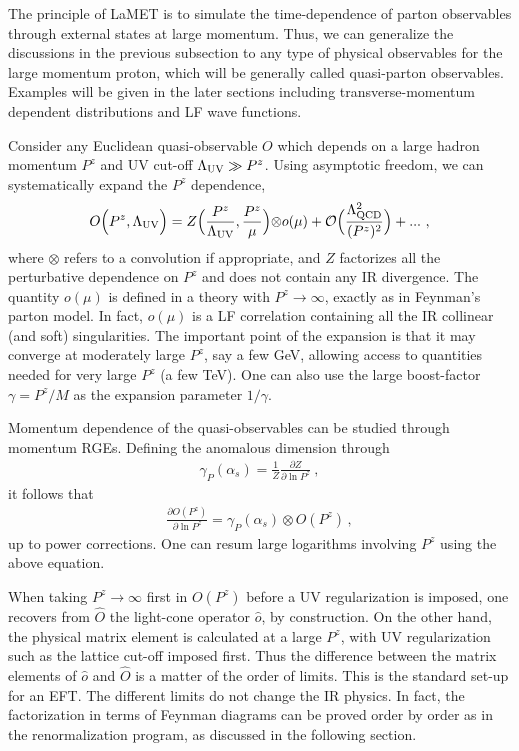 The principle of LaMET is to simulate the time-dependence of parton observables through external states at large momentum.
Thus, we can generalize the discussions in the previous subsection
to any type of physical observables for the large momentum
proton, which will be generally called quasi-parton observables.
Examples will be given in the later sections including
transverse-momentum dependent distributions and LF wave functions.

Consider any Euclidean quasi-observable $O$ which depends
on a large hadron momentum $P^z$
and UV cut-off $\Lambda_{\rm UV}\gg P^z$.
Using asymptotic freedom, we can systematically
expand the $P^z$ dependence,
\begin{align}
	O\Big(P^z,\Lambda_{\rm UV}\Big) = Z\Big({P^z\over\Lambda_{\rm UV}},
	{P^z\over \mu}\Big){\otimes}o(\mu) + {\cal O}\Big({\Lambda_{\rm QCD}^2\over (P^z)^2}\Big)+ ... \ ,
	\label{eq:Expansion}
\end{align}
where $\otimes$ refers to a convolution if appropriate, and $Z$ factorizes all the perturbative
dependence on $P^z$ and does not contain any IR divergence.
The quantity $o(\mu)$ is defined in a theory with $P^z\rightarrow \infty$, exactly
as in Feynman's parton model. In fact, $o(\mu)$ is a LF
correlation containing all the IR collinear (and soft)
singularities. The important point of the expansion is that it
may converge at moderately large $P^z$, say a few GeV, allowing
access to quantities needed for very large $P^z$ (a few TeV).
One can also use the large boost-factor $\gamma=P^z/M$ as the expansion
parameter $1/\gamma$.

Momentum dependence of the quasi-observables can be
studied through momentum RGEs. Defining the anomalous dimension through
\begin{align}
	\gamma_P(\alpha_s) = \frac{1}{Z}\frac{\partial Z}{\partial \ln P^z} \ ,
\end{align}
it follows{ that}
\begin{align}
	\frac{\partial O(P^z)}{\partial \ln P^z} = \gamma_P(\alpha_s) \otimes O(P^z) \,,
\end{align}
up to power corrections. One can resum large logarithms involving $P^z$ using the above equation.

When taking $P^z\rightarrow \infty$ first
in $O(P^z)$ before a UV regularization is imposed, one recovers from $\hat O$ the
light-cone operator $\hat o$, by construction. On the other hand, the physical matrix
element is calculated at a large $P^z$, with UV regularization such as the lattice cut-off
imposed first. Thus the difference between the matrix elements of $\hat o$ and $\hat O$ is a matter of
the order of limits. This is the standard set-up for an EFT. The different limits do
not change the IR physics. In fact, the factorization in terms of Feynman diagrams
can be proved order by order as in the renormalization program, as discussed in the
following section.

